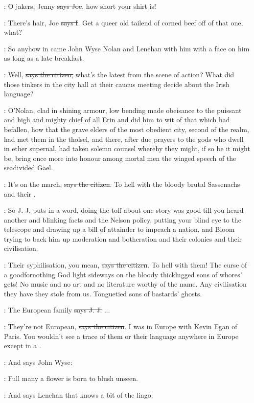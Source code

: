 \joe:
O jakers, Jenny \sout{says Joe},
how short your shirt is!

:
There's hair, Joe \sout{says I}.
Get a queer old tailend of corned beef off of
that one, what?

\Nq:
So anyhow in came John Wyse Nolan and Lenehan with him with a
face on him as long as a late breakfast.

\citizen:
Well, \sout{says the citizen,}
what's the latest from the scene of action? What
did those tinkers in the city hall at their caucus meeting decide about
the Irish language?

:
O'Nolan, clad in shining armour, low bending made obeisance to the
puissant and high and mighty chief of all Erin and did him to wit of that
which had befallen, how that the grave elders of the most obedient city,
second of the realm, had met them in the tholsel, and there, after due
prayers to the gods who dwell in ether supernal, had taken solemn counsel
whereby they might, if so be it might be, bring once more into honour
among mortal men the winged speech of the seadivided Gael.

\citizen:
It's on the march, \sout{says the citizen}.
To hell with the bloody brutal
Sassenachs and their .

\Nq:
So J. J. puts in a word, doing the toff about one story was good till
you heard another and blinking facts and the Nelson policy, putting your
blind eye to the telescope and drawing up a bill of attainder to impeach a
nation, and Bloom trying to back him up moderation and botheration and
their colonies and their civilisation.

\citizen:
Their syphilisation, you mean, \sout{says the citizen}.
To hell with them! The
curse of a goodfornothing God light sideways on the bloody thicklugged
sons of whores' gets! No music and no art and no literature worthy of the
name. Any civilisation they have they stole from us.
Tonguetied sons of
bastards' ghosts.

\jjom:
The European family
\sout{says J. J.} ...

\citizen:
They're not European, \sout{says the citizen}.
I was in Europe with Kevin Egan
of Paris. You wouldn't see a trace of them or their language anywhere in
Europe except in a .

\Nq:
And says John Wyse:

\johnwyse:
Full many a flower is born to blush unseen.

\Nq:
And says Lenehan that knows a bit of the lingo:

